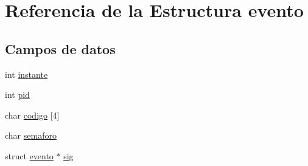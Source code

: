 \hypertarget{structevento}{\section{Referencia de la Estructura evento}
\label{structevento}
}
\subsection*{Campos de datos}
\begin{DoxyCompactItemize}
\item 
int \hyperlink{structevento_a8fbfa37705af883fec99b428586416b6}{instante}
\item 
int \hyperlink{structevento_ac3b0a8c87cce053e4200e7135398b9bb}{pid}
\item 
char \hyperlink{structevento_a3cccf0303093589ffa836df8f368bdef}{codigo} \mbox{[}4\mbox{]}
\item 
char \hyperlink{structevento_a7da79f66e192bd5ce943d984d676e126}{semaforo}
\item 
struct \hyperlink{structevento}{evento} $\ast$ \hyperlink{structevento_a2575b8410e413713cad01644e2ae6565}{sig}
\end{DoxyCompactItemize}


